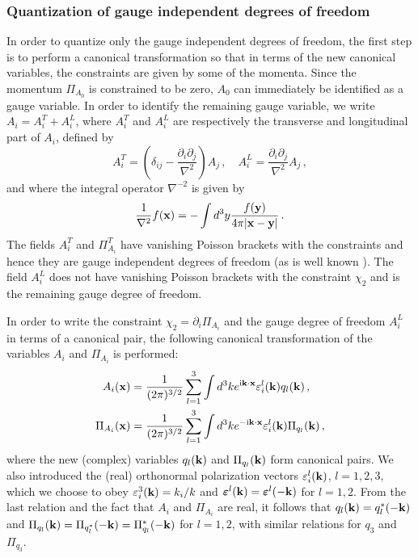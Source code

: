 \documentclass[12pt]{article}
\def\ii{\textrm i}
\begin{document}
\subsubsection{Quantization of gauge independent degrees of freedom}
In order to quantize only the gauge independent degrees of freedom, the first step is to perform a canonical transformation so that in terms of the new canonical variables, the constraints are given by some of the momenta. Since the momentum $\Pi_{A_0}$ is constrained to be zero, $A_0$ can immediately be identified as a gauge variable. In order to identify the remaining gauge variable, we write $A_i = A^T_i + A^L_i$, where $A^T_i$ and $A^L_i$ are respectively the transverse and longitudinal part of $A_i$, defined by 
\begin{equation}
A^T_i =  \left(\delta_{ij} -  \frac{\partial_i \partial_j }{\nabla^2}\right) A_j\,, \quad A^L_i =  \frac{\partial_i \partial_j }{\nabla^2} A_j\,,
\label{e.7}
\end{equation}
and where the integral operator $\nabla^{-2}$ is given by
\begin{equation}
\frac{1}{\nabla^2} f({\bf x}) = -\int d^3 y \frac{f({\bf y})}{4\pi|{\bf x}-{\bf y}|}\,.
\label{e.8}
\end{equation}
The fields $A^T_i$ and $\Pi^T_{A_i}$ have vanishing Poisson brackets with the constraints and hence they are gauge independent degrees of freedom (as is well known \cite{dirac67,hanson76,sundermeyer82,gitman90,henneaux91}). The field $A^L_i$ does not have vanishing Poisson brackets with the constraint $\chi_2$ and is the remaining gauge degree of freedom. 

In order to write the constraint $\chi_2=\partial_i \Pi_{A_i}$ and the gauge degree of freedom $A^L_i$ in terms of a canonical pair, the following canonical transformation of the variables $A_i$ and $\Pi_{A_i}$ is performed: 
\begin{align}
A_i({\bf x}) &= \frac{1}{(2\pi)^{3/2}} \sum^3_{l=1} \int d^3 k e^{\ii {\bf k} \cdot {\bf x}} \varepsilon^l_i({\bf k}) q_l({\bf k})\,, \nonumber\\  
\Pi_{A_i}({\bf x})  &=  \frac{1}{(2\pi)^{3/2}} \sum^3_{l=1} \int d^3 k e^{-\ii {\bf k} \cdot {\bf x}} \varepsilon^l_i({\bf k}) \Pi_{q_l}({\bf k})\,, 
\label{e.9}
\end{align}
where the new (complex) variables $q_l({\bf k})$ and $\Pi_{q_l}({\bf k})$ form canonical pairs. We also introduced the (real) orthonormal polarization vectors $\varepsilon^l_i({\bf k})$, $l=1,2,3$, which we choose to obey $\varepsilon^3_i({\bf k})= k_i/k$ and ${\boldsymbol \varepsilon}^l({\bf k}) = {\boldsymbol \varepsilon}^l(-{\bf k})$ for $l=1,2$. From the last relation and the fact that $A_i$ and $\Pi_{A_i}$ are real, it follows that $q_l({\bf k}) = q^*_l(-{\bf k})$ and $\Pi_{q_l}({\bf k}) = \Pi_{q^*_l}(-{\bf k}) = \Pi^*_{q_l}(-{\bf k})$ for $l=1,2$, with similar relations for $q_3$ and $\Pi_{q_3}$. 
\end{document}
